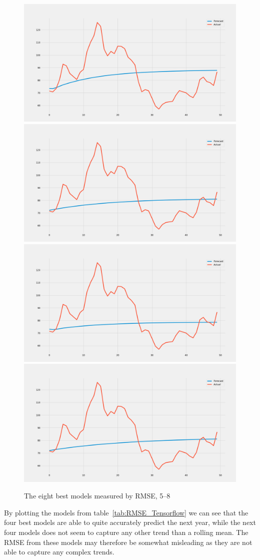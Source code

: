 \begin{figure}[H]
    \includegraphics[width=.48\textwidth]{../data/Figures/Neural networks/ForLoop_Tensor/plotmodel_202.png}\hfill
    \includegraphics[width=.48\textwidth]{../data/Figures/Neural networks/ForLoop_Tensor/plotmodel_124.png}\hfill
    \\[\smallskipamount]
    \includegraphics[width=.48\textwidth]{../data/Figures/Neural networks/ForLoop_Tensor/plotmodel_130.png}\hfill
    \includegraphics[width=.48\textwidth]{../data/Figures/Neural networks/ForLoop_Tensor/plotmodel_52.png}\hfill
    \caption[The eight best models measured by RMSE, 5--8]{The eight best models measured by RMSE, 5--8}\label{fig:best_models58}
\end{figure}

By plotting the models from table~\ref{tab:RMSE_Tensorflow} we can see that the four best models are able to quite accurately predict the next year, while the next four models does not seem to capture any other trend than a rolling mean. The RMSE from these models may therefore be somewhat misleading as they are not able to capture any complex trends. 

